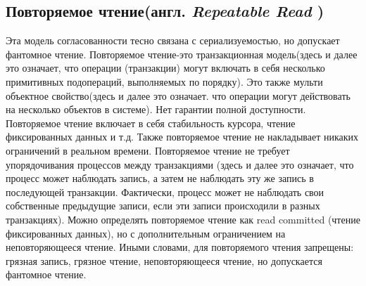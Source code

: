 \documentclass[12pt,  openany]{book}
\begin{document}
\subsection{Повторяемое чтение(англ.  \textit{Repeatable Read })}
Эта модель согласованности тесно связана с сериализуемостью, но допускает фантомное чтение.
Повторяемое чтение-это транзакционная модель(здесь и далее это означает, что операции (транзакции) могут включать в себя несколько примитивных подопераций, выполняемых по порядку). Это также мульти объектное свойство(здесь и далее это означает. что операции могут действовать на несколько объектов в системе).
Нет гарантии полной доступности.
Повторяемое чтение включает в себя стабильность курсора, чтение фиксированных данных и т.д.
Также повторяемое чтение не накладывает никаких ограничений в реальном времени.
Повторяемое чтение не требует упорядочивания процессов между транзакциями (здесь и далее это означает, что процесс может наблюдать запись, а затем не наблюдать эту же запись в последующей транзакции. Фактически, процесс может не наблюдать свои собственные предыдущие записи, если эти записи происходили в разных транзакциях).
Можно определять повторяемое чтение как  read committed (чтение фиксированных данных), но с дополнительным ограничением на неповторяющееся чтение.
Иными словами, для повторяемого чтения запрещены: грязная запись, грязное чтение, неповторяющееся чтение, но допускается фантомное чтение. 
\end{document}
